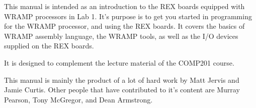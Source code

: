 This manual is intended as an introduction to the REX boards equipped with WRAMP processors in Lab 1.
It's purpose is to get you started in programming for the WRAMP processor, and using the REX boards. It covers the basics of WRAMP assembly language, the WRAMP tools, as well as the I/O devices supplied on the REX boards.

It is designed to complement the lecture material of the COMP201 course.

This manual is mainly the product of a lot of hard work by Matt Jervis and Jamie Curtis. Other people that have contributed to it's content are Murray Pearson, Tony McGregor, and Dean Armstrong.